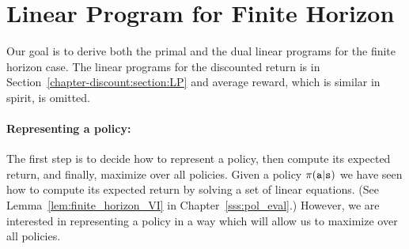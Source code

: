 
\section{Linear Program for Finite Horizon}
\label{C-MDP-FH:sec:LP}

Our goal is to derive both the primal and the dual linear programs for the finite horizon case. The linear programs for the discounted return is in Section~\ref{chapter-discount:section:LP} and average reward, which is similar in spirit, is omitted.

\paragraph{Representing a policy:}
The first step is to decide how to represent a policy, then compute its expected return, and finally, maximize over all policies.
Given a policy $\pi({\tt a}|{\tt s})$ we have seen how to compute its expected return by solving a set of linear equations. (See Lemma~\ref{lem:finite_horizon_VI} in Chapter~\ref{sss:pol_eval}.)
However, we are interested in representing a policy in a way which will allow us to maximize over all policies.

